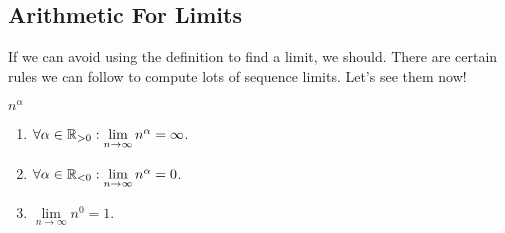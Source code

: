 \subsection{Arithmetic For Limits}
If we can avoid using the definition to find a limit, we should.
There are certain rules we can follow to compute lots of sequence limits.
Let's see them now!
\begin{Theorem}{\href{https://proofwiki.org/wiki/Divergent_Real_Sequence_to_Positive_Infinity/Examples/n\%5Ealpha}{$ n^{\alpha} $}}{}
    \begin{enumerate}[(1)]
        \item $ \forall \alpha\in\mathbb{R}_{>0}:\lim\limits_{{n} \to {\infty}}n^\alpha=\infty $.
        \item $ \forall \alpha\in\mathbb{R}_{<0}:\lim\limits_{{n} \to {\infty}}n^\alpha=0 $.
        \item $ \lim\limits_{{n} \to {\infty}}n^0=1 $.
    \end{enumerate}
\end{Theorem}
